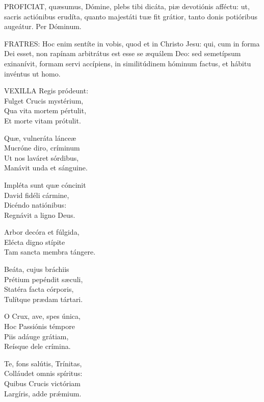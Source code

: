 
\lettrine[lines=2]{P}{ROFICIAT}, quæsumus, Dómine, plebs tibi dicáta, piæ devotiónis afféctu: ut, sacris actiónibus erudíta, quanto majestáti tuæ fit grátior, tanto donis potióribus augeátur. Per Dóminum.




\lettrine[lines=2]{F}{RATRES}: Hoc enim sentíte in vobis, quod et in Christo Jesu: qui, cum in forma Dei esset, non rapínam arbitrátus est esse se æquálem Deo: sed semetípsum exinanívit, formam servi accípiens, in similitúdinem hóminum factus, et hábitu invéntus ut homo.


\lettrine[lines=2]{V}{EXILLA} Regis pródeunt:\\
Fulget Crucis mystérium,\\
Qua vita mortem pértulit,\\
Et morte vitam prótulit.

Quæ, vulneráta lánceæ\\
Mucróne diro, críminum\\
Ut nos laváret sórdibus,\\
Manávit unda et sánguine.

Impléta sunt quæ cóncinit\\
David fidéli cármine,\\
Dicéndo natiónibus:\\
Regnávit a ligno Deus.

Arbor decóra et fúlgida,\\
Elécta digno stípite\\
Tam sancta membra tángere.

Beáta, cujus bráchiis\\
Prétium pepéndit sæculi,\\
Statéra facta córporis,\\
Tulítque prædam tártari.


O Crux, ave, spes única,\\
Hoc Passiónis témpore\\
Piis adáuge grátiam,\\
Reísque dele crímina.

Te, fons salútis, Trínitas,\\
Colláudet omnis spíritus:\\
Quibus Crucis victóriam\\
Largíris, adde prǽmium.

